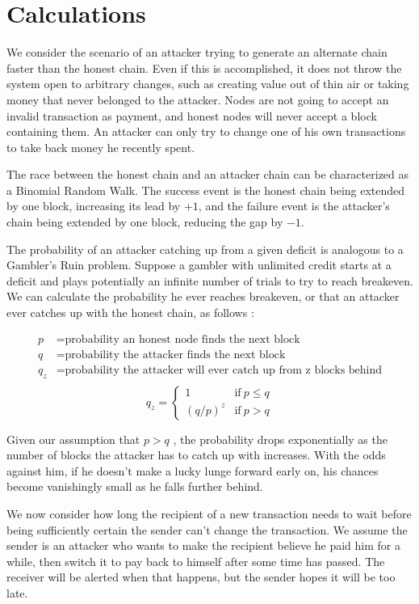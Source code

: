 \documentclass[10pt]{book}
\begin{document}
\part{Calculations}
We consider the scenario of an attacker trying to generate an alternate chain faster than the honest chain.
Even if this is accomplished, it does not throw the system open to arbitrary changes, such as creating value out of thin air or taking money that never belonged to the attacker.
Nodes are not going to accept an invalid transaction as payment, and honest nodes will never accept a block containing them.
An attacker can only try to change one of his own transactions to take back money he recently spent.

The race between the honest chain and an attacker chain can be characterized as a Binomial Random Walk.
The success event is the honest chain being extended by one block, increasing its lead by \(+1\), and the failure event is the attacker's chain being extended by one block, reducing the gap by \(-1\).

The probability of an attacker catching up from a given deficit is analogous to a Gambler's Ruin problem.
Suppose a gambler with unlimited credit starts at a deficit and plays potentially an infinite number of trials to try to reach breakeven.
We can calculate the probability he ever reaches breakeven, or that an attacker ever catches up with the honest chain, as follows \cite{Feller}:

\begin{align*}
p &= \text{probability an honest node finds the next block} \\
q &= \text{probability the attacker finds the next block} \\
q_z &= \text{probability the attacker will ever catch up from z blocks behind} \\
\end{align*}
$$q_z = \begin{cases} 1 & \text{if}\ p \leq q \\ (q/p)^z & \text{if}\ p>q \end{cases}$$

Given our assumption that \(p > q\) , the probability drops exponentially as the number of blocks the attacker has to catch up with increases.
With the odds against him, if he doesn't make a lucky lunge forward early on, his chances become vanishingly small as he falls further behind.

We now consider how long the recipient of a new transaction needs to wait before being sufficiently certain the sender can't change the transaction.
We assume the sender is an attacker who wants to make the recipient believe he paid him for a while, then switch it to pay back to himself after some time has passed.
The receiver will be alerted when that happens, but the sender hopes it will be too late.
\end{document}
